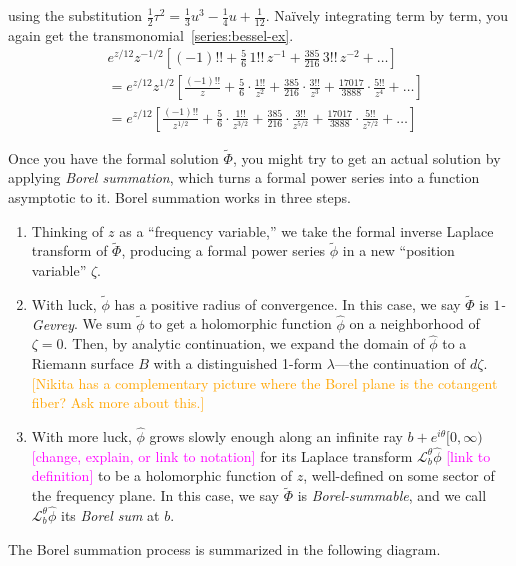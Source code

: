 \documentclass{article}
\newcommand{\laplace}{\mathcal{L}}
\newcommand{\series}{\tilde}
\begin{document}
using the substitution $\tfrac{1}{2} \tau^2 = \tfrac{1}{3} u^3 - \tfrac{1}{4} u + \tfrac{1}{12}$. Na\"{i}vely integrating term by term, you again get the transmonomial~\eqref{series:bessel-ex}.
\color{DodgerBlue}
\begin{align*}
& e^{z/12} z^{-1/2} \left[ (-1)!! + \frac{5}{6}\,1!!\,z^{-1} + \frac{385}{216}\,3!!\,z^{-2} + \ldots \right] \\
& = e^{z/12} z^{1/2} \left[ \frac{(-1)!!}{z} + \frac{5}{6} \cdot \frac{1!!}{z^2} + \frac{385}{216} \cdot \frac{3!!}{z^3} + \frac{17017}{3888} \cdot \frac{5!!}{z^4} + \ldots \right] \\
& = e^{z/12} \left[ \frac{(-1)!!}{z^{1/2}} + \frac{5}{6} \cdot \frac{1!!}{z^{3/2}} + \frac{385}{216} \cdot \frac{3!!}{z^{5/2}} + \frac{17017}{3888} \cdot \frac{5!!}{z^{7/2}} + \ldots \right]
\end{align*}
\color{black}

Once you have the formal solution $\series{\Phi}$, you might try to get an actual solution by applying {\em Borel summation}, which turns a formal power series into a function asymptotic to it. Borel summation works in three steps.
\begin{enumerate}
\item Thinking of $z$ as a ``frequency variable,'' we take the formal inverse Laplace transform of $\series{\Phi}$, producing a formal power series $\series{\phi}$ in a new ``position variable'' $\zeta$.
\item With luck, $\series{\phi}$ has a positive radius of convergence. In this case, we say $\series{\Phi}$ is {\em $1$-Gevrey}. We sum $\series{\phi}$ to get a holomorphic function $\hat{\phi}$ on a neighborhood of $\zeta = 0$. Then, by analytic continuation, we expand the domain of $\hat{\phi}$ to a Riemann surface $B$ with a distinguished 1-form $\lambda$---the continuation of $d\zeta$. \textcolor{orange}{[Nikita has a complementary picture where the Borel plane is the cotangent fiber? Ask more about this.]}
\item With more luck, $\hat{\phi}$ grows slowly enough along an infinite ray $b + e^{i\theta}[0, \infty)$ \textcolor{magenta}{[change, explain, or link to notation]} for its Laplace transform $\laplace_b^\theta \hat{\phi}$ \textcolor{magenta}{[link to definition]} to be a holomorphic function of $z$, well-defined on some sector of the frequency plane. In this case, we say $\tilde{\Phi}$ is {\em Borel-summable}, and we call $\laplace_b^\theta \hat{\phi}$ its {\em Borel sum} at $b$.
\end{enumerate}
The Borel summation process is summarized in the following diagram.
\begin{center}
\end{center}
\end{document}

